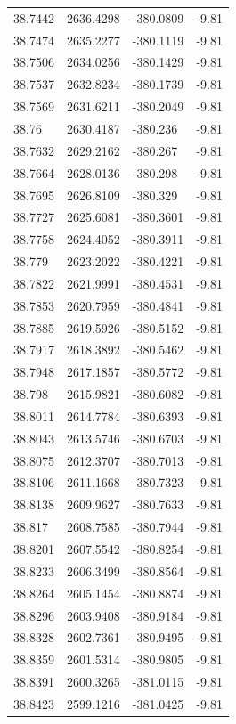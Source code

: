 \begin{table}[H]
\begin{tabular}{llll}
38.7442 & 2636.4298 & -380.0809 & -9.81 \\
38.7474 & 2635.2277 & -380.1119 & -9.81 \\
38.7506 & 2634.0256 & -380.1429 & -9.81 \\
38.7537 & 2632.8234 & -380.1739 & -9.81 \\
38.7569 & 2631.6211 & -380.2049 & -9.81 \\
38.76 & 2630.4187 & -380.236 & -9.81 \\
38.7632 & 2629.2162 & -380.267 & -9.81 \\
38.7664 & 2628.0136 & -380.298 & -9.81 \\
38.7695 & 2626.8109 & -380.329 & -9.81 \\
38.7727 & 2625.6081 & -380.3601 & -9.81 \\
38.7758 & 2624.4052 & -380.3911 & -9.81 \\
38.779 & 2623.2022 & -380.4221 & -9.81 \\
38.7822 & 2621.9991 & -380.4531 & -9.81 \\
38.7853 & 2620.7959 & -380.4841 & -9.81 \\
38.7885 & 2619.5926 & -380.5152 & -9.81 \\
38.7917 & 2618.3892 & -380.5462 & -9.81 \\
38.7948 & 2617.1857 & -380.5772 & -9.81 \\
38.798 & 2615.9821 & -380.6082 & -9.81 \\
38.8011 & 2614.7784 & -380.6393 & -9.81 \\
38.8043 & 2613.5746 & -380.6703 & -9.81 \\
38.8075 & 2612.3707 & -380.7013 & -9.81 \\
38.8106 & 2611.1668 & -380.7323 & -9.81 \\
38.8138 & 2609.9627 & -380.7633 & -9.81 \\
38.817 & 2608.7585 & -380.7944 & -9.81 \\
38.8201 & 2607.5542 & -380.8254 & -9.81 \\
38.8233 & 2606.3499 & -380.8564 & -9.81 \\
38.8264 & 2605.1454 & -380.8874 & -9.81 \\
38.8296 & 2603.9408 & -380.9184 & -9.81 \\
38.8328 & 2602.7361 & -380.9495 & -9.81 \\
38.8359 & 2601.5314 & -380.9805 & -9.81 \\
38.8391 & 2600.3265 & -381.0115 & -9.81 \\
38.8423 & 2599.1216 & -381.0425 & -9.81 \\

\end{tabular}
\end{table}
